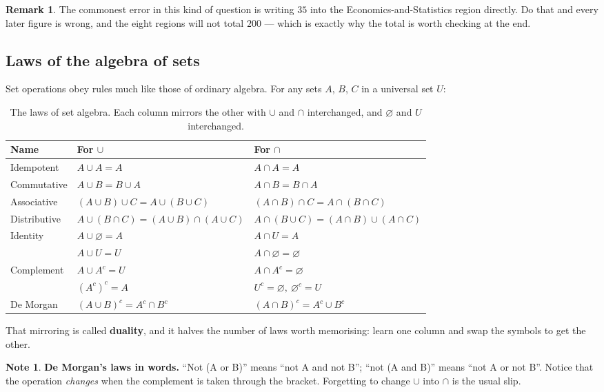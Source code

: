 \documentclass[11pt,a4paper]{article}
\theoremstyle{definition}
\newtheorem{note}[thm]{Note}
\newtheorem{remark}[thm]{Remark}
\begin{document}
\begin{remark}
The commonest error in this kind of question is writing $35$ into the
Economics-and-Statistics region directly. Do that and every later figure is wrong,
and the eight regions will not total $200$ --- which is exactly why the total is worth
checking at the end.
\end{remark}

\subsection{Laws of the algebra of sets}

Set operations obey rules much like those of ordinary algebra. For any sets $A$, $B$,
$C$ in a universal set $U$:

\begin{table}[H]
\centering
\begin{tabular}{|l|l|l|}
\hline
Name & For $\cup$ & For $\cap$\\
\hline
Idempotent & $A\cup A=A$ & $A\cap A=A$\\
Commutative & $A\cup B=B\cup A$ & $A\cap B=B\cap A$\\
Associative & $(A\cup B)\cup C=A\cup(B\cup C)$ & $(A\cap B)\cap C=A\cap(B\cap C)$\\
Distributive & $A\cup(B\cap C)=(A\cup B)\cap(A\cup C)$ & $A\cap(B\cup C)=(A\cap B)\cup(A\cap C)$\\
Identity & $A\cup\varnothing=A$ & $A\cap U=A$\\
 & $A\cup U=U$ & $A\cap\varnothing=\varnothing$\\
Complement & $A\cup A^c=U$ & $A\cap A^c=\varnothing$\\
 & $(A^c)^c=A$ & $U^c=\varnothing,\ \varnothing^c=U$\\
De Morgan & $(A\cup B)^c=A^c\cap B^c$ & $(A\cap B)^c=A^c\cup B^c$\\
\hline
\end{tabular}
\caption{The laws of set algebra. Each column mirrors the other with $\cup$ and $\cap$ interchanged, and $\varnothing$ and $U$ interchanged.}
\end{table}

That mirroring is called \textbf{duality}, and it halves the number of laws worth
memorising: learn one column and swap the symbols to get the other.

\begin{note}
\textbf{De Morgan's laws in words.} ``Not (A or B)'' means ``not A and not B''; ``not
(A and B)'' means ``not A or not B''. Notice that the operation \emph{changes} when
the complement is taken through the bracket. Forgetting to change $\cup$ into $\cap$
is the usual slip.
\end{note}
\end{document}
